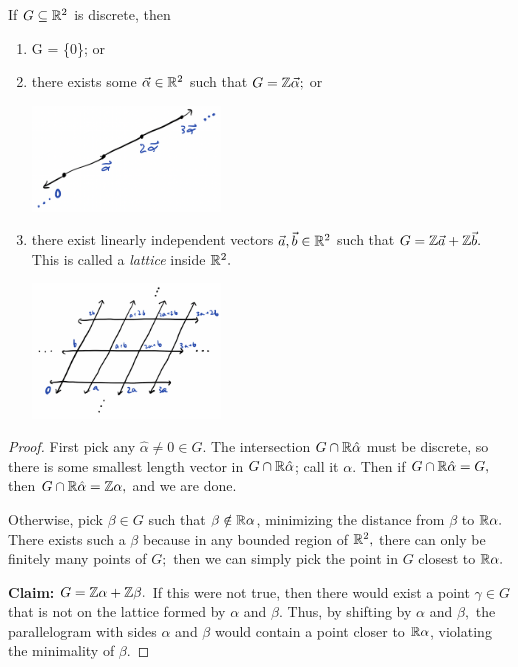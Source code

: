 \begin{theorem}\label{discrete sub of r2}
If $G \subseteq \mathbb R^2$ is discrete, then 
\begin{enumerate}
    \item G = \{0\}; or
    \item there exists some $\vec{\alpha} \in \mathbb R^2$ such that $G = \mathbb Z \vec{\alpha};$ or
    
\begin{center}
    \includegraphics[width=5cm]{Lecture Files and Images/lec16-line.png}
\end{center}
    \item there exist linearly independent vectors $\vec{a}, \vec{b} \in \mathbb R^2$ such that $G = \mathbb Z \vec{a} + \mathbb Z \vec{b}.$ This is called a \emph{lattice} inside $\mathbb R^2.$
\begin{center}
    \includegraphics[width=5cm]{Lecture Files and Images/lec15-lattice.png}
\end{center}
\end{enumerate}
\end{theorem}

\begin{proof}
First pick any $\hat{\alpha} \neq 0 \in G.$ The intersection $G \cap \mathbb R\hat{\alpha}$ must be discrete, so there is some smallest length vector in $G \cap \mathbb R\hat{\alpha}$; call it $\alpha.$ Then if $G \cap \mathbb R\hat{\alpha} = G,$ then $G \cap \mathbb R\hat{\alpha} = \mathbb Z\alpha,$ and we are done. %

Otherwise, pick $\beta \in G$ such that $\beta \notin \mathbb R\alpha$, minimizing the distance from $\beta$ to $\mathbb R\alpha.$ There exists such a $\beta$ because in any bounded region of $\mathbb R^2,$ there can only be finitely many points of $G;$ then we can simply pick the point in $G$ closest to $\mathbb R\alpha.$ 

\textbf{Claim: $G = \mathbb Z\alpha + \mathbb Z\beta.$} If this were not true, then there would exist a point $\gamma \in G$ that is not on the lattice formed by $\alpha$ and $\beta.$ Thus, by shifting by $\alpha$ and $\beta,$ the parallelogram with sides $\alpha$ and $\beta$ would contain a point closer to $\mathbb R\alpha$, violating the minimality of $\beta$. 
\end{proof}

